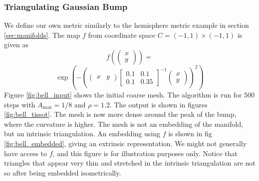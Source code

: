\subsubsection*{Triangulating Gaussian Bump}
We define our own metric similarly to the hemisphere metric example in section \ref{sec:manifolds}.
The map $f$ from coordinate space $C = (-1, 1) \times (-1, 1)$ is given as 
$$f(\begin{pmatrix}
    x \\ y
\end{pmatrix}) = $$
$$\exp\left(-\left(\begin{pmatrix}
    x & y
\end{pmatrix} \begin{bmatrix} 0.1 & 0.1 \\ 0.1 & 0.35 \end{bmatrix}^{-\!1} \begin{pmatrix}
    x \\ y
\end{pmatrix}\right)^2\right)$$
Figure \ref{fig:bell_input} shows the initial coarse mesh. The algorithm is run for $500$ steps with $A_{\text{max}} = 1/8$ and $\rho = 1.2$. The output is shown in figures \ref{fig:bell_tissot}. The mesh is now more dense around the peak of the bump, where the curvature is higher. The mesh is not an embedding of the manifold, but an intrinsic triangulation. An embedding using $f$ is shown in fig \ref{fig:bell_embedded}, giving an extrinsic representation. We might not generally have access to $f$, and this figure is for illustration purposes only. Notice that triangles that appear very thin and stretched in the intrinsic triangulation are not so after being embedded isometrically.
